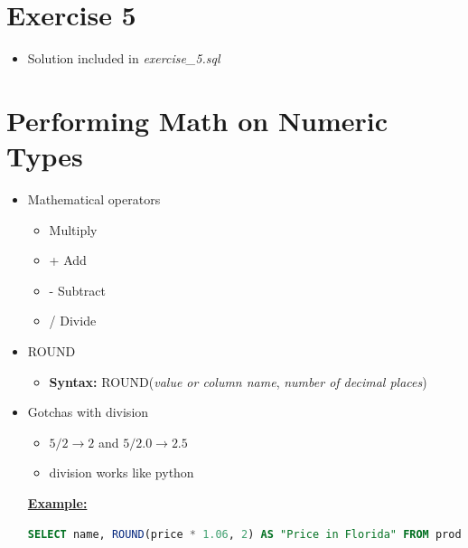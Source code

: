 \documentclass[12pt]{article}
\begin{document}
\bigskip

\section{Exercise 5}

\bigskip

\begin{itemize}
    \item Solution included in \textit{exercise\_5.sql}
\end{itemize}

\bigskip

\section{Performing Math on Numeric Types}

\bigskip

\begin{itemize}
    \item Mathematical operators
    \begin{itemize}
        \item \* Multiply
        \item + Add
        \item - Subtract
        \item / Divide
    \end{itemize}
    \item ROUND
    \begin{itemize}
        \item \textbf{Syntax:} ROUND(\textit{value or column name}, \textit{number of decimal places})
    \end{itemize}
    \item Gotchas with division
    \begin{itemize}
        \item $5 / 2 \to 2$ and $5 / 2.0 \to 2.5$
        \item division works like python
    \end{itemize}

    \bigskip

    \underline{\textbf{Example:}}

    \bigskip

    \begin{lstlisting}[language=SQL]
    SELECT name, ROUND(price * 1.06, 2) AS "Price in Florida" FROM products;
    \end{lstlisting}

\end{itemize}
\end{document}
